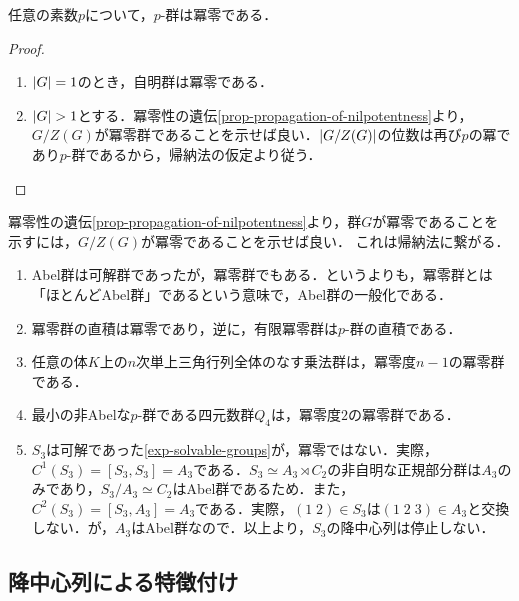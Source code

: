 \documentclass[uplatex,dvipdfmx]{jsreport}
\begin{document}
\begin{proposition}[$p$-群は冪零である]
    任意の素数$p$について，$p$-群は冪零である．
\end{proposition}
\begin{proof}\mbox{}
    \begin{enumerate}
        \item $\lvert G\rvert=1$のとき，自明群は冪零である．
        \item $\lvert G\rvert>1$とする．冪零性の遺伝\ref{prop-propagation-of-nilpotentness}より，$G/Z(G)$が冪零群であることを示せば良い．$\lvert G/Z(G)\rvert$の位数は再び$p$の冪であり$p$-群であるから，帰納法の仮定より従う．
    \end{enumerate}
\end{proof}
\begin{remarks}
    冪零性の遺伝\ref{prop-propagation-of-nilpotentness}より，群$G$が冪零であることを示すには，$G/Z(G)$が冪零であることを示せば良い．
    これは帰納法に繋がる．
\end{remarks}

\begin{example}[冪零群の例]\mbox{}\label{exp-nilpotent-groups}
    \begin{enumerate}
        \item Abel群は可解群であったが，冪零群でもある．というよりも，冪零群とは「ほとんどAbel群」であるという意味で，Abel群の一般化である．
        \item 冪零群の直積は冪零であり，逆に，有限冪零群は$p$-群の直積である．
        \item 任意の体$K$上の$n$次単上三角行列全体のなす乗法群は，冪零度$n-1$の冪零群である．
        \item 最小の非Abelな$p$-群である四元数群$Q_4$は，冪零度$2$の冪零群である．
        \item $S_3$は可解であった\ref{exp-solvable-groups}が，冪零ではない．実際，$C^1(S_3)=[S_3,S_3]=A_3$である．$S_3\simeq A_3\rtimes C_2$の非自明な正規部分群は$A_3$のみであり，$S_3/A_3\simeq C_2$はAbel群であるため．また，$C^2(S_3)=[S_3,A_3]=A_3$である．実際，$(1\;2)\in S_3$は$(1\;2\;3)\in A_3$と交換しない．が，$A_3$はAbel群なので．以上より，$S_3$の降中心列は停止しない．
    \end{enumerate}
\end{example}

\subsection{降中心列による特徴付け}
\end{document}
